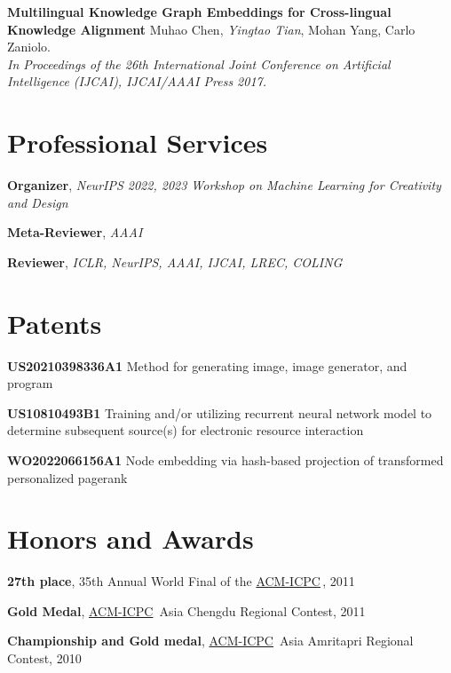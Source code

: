 \documentclass[line,margin]{cv}
\newcommand{\myemph}{\textbf}
\newcommand{\ICPC}{\href{http://icpc.baylor.edu/}{ACM-ICPC}}
\begin{document}
\begin{resume}
  {\bf Multilingual Knowledge Graph Embeddings for Cross-lingual Knowledge Alignment}
  Muhao Chen, \emph{Yingtao Tian}, Mohan Yang, Carlo Zaniolo.\\
  \emph{In Proceedings of the 26th International Joint Conference on Artificial Intelligence (IJCAI), IJCAI/AAAI Press 2017.}

\section{Professional Services }
  \myemph{Organizer}, \emph{NeurIPS 2022, 2023 Workshop on Machine Learning for Creativity and Design}

  \myemph{Meta-Reviewer}, \emph{AAAI}

  \myemph{Reviewer}, \emph{ICLR, NeurIPS, AAAI, IJCAI, LREC, COLING}

\section{Patents}

  \myemph{US20210398336A1} Method for generating image, image generator, and program

  \myemph{US10810493B1} Training and/or utilizing recurrent neural network model to determine subsequent source(s) for electronic resource interaction
  
  \myemph{WO2022066156A1} Node embedding via hash-based projection of transformed personalized pagerank
  

\section{Honors and Awards}
	\myemph{27th place}, 35th Annual World Final of the \ICPC \,, 2011

	\myemph{Gold Medal}, \ICPC\ Asia Chengdu Regional Contest, 2011

	\myemph{Championship and Gold medal}, \ICPC\ Asia Amritapri Regional Contest, 2010

\end{resume}
\end{document}
